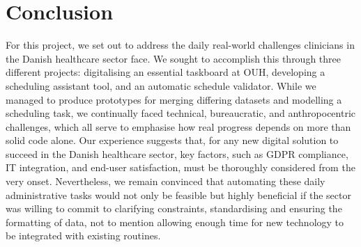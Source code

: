 \section{Conclusion}
For this project, we set out to address the daily real-world challenges clinicians in the Danish healthcare sector face. We sought to accomplish this through three different projects: digitalising an essential taskboard at OUH, developing a scheduling assistant tool, and an automatic schedule validator. While we managed to produce prototypes for merging differing datasets and modelling a scheduling task, we continually faced technical, bureaucratic, and anthropocentric challenges, which all serve to emphasise how real progress depends on more than solid code alone. Our experience suggests that, for any new digital solution to succeed in the Danish healthcare sector, key factors, such as GDPR compliance, IT integration, and end-user satisfaction, must be thoroughly considered from the very onset. Nevertheless, we remain convinced that automating these daily administrative tasks would not only be feasible but highly beneficial if the sector was willing to commit to clarifying constraints, standardising and ensuring the formatting of data, not to mention allowing enough time for new technology to be integrated with existing routines.